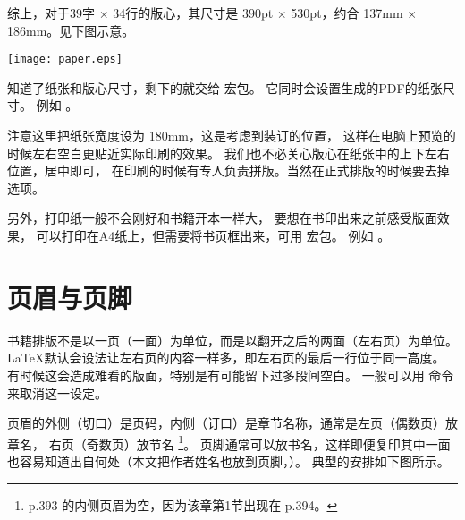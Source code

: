 综上，对于39字 $\times$ 34行的版心，其尺寸是 390pt $\times$ 530pt，约合 137mm $\times$ 186mm。见下图示意。

\centerline{\texttt{[image: paper.eps]}}

知道了纸张和版心尺寸，剩下的就交给  宏包。
它同时会设置生成的PDF的纸张尺寸。
例如 。


注意这里把纸张宽度设为 180mm，这是考虑到装订的位置，
这样在电脑上预览的时候左右空白更贴近实际印刷的效果。
我们也不必关心版心在纸张中的上下左右位置，居中即可，
在印刷的时候有专人负责拼版。当然在正式排版的时候要去掉  选项。

另外，打印纸一般不会刚好和书籍开本一样大，
要想在书印出来之前感受版面效果，
可以打印在A4纸上，但需要将书页框出来，可用  宏包。
例如 。


\section{页眉与页脚} %

书籍排版不是以一页（一面）为单位，而是以翻开之后的两面（左右页）为单位。
\LaTeX 默认会设法让左右页的内容一样多，即左右页的最后一行位于同一高度。
有时候这会造成难看的版面，特别是有可能留下过多段间空白。
一般可以用  命令来取消这一设定。

页眉的外侧（切口）是页码，内侧（订口）是章节名称，通常是左页（偶数页）放章名，
右页（奇数页）放节名
\footnote{\mybooktitle p.393 的内侧页眉为空，因为该章第1节出现在 p.394。}。
页脚通常可以放书名，这样即便复印其中一面也容易知道出自何处（本文把作者姓名也放到页脚，）。
典型的安排如下图所示。

